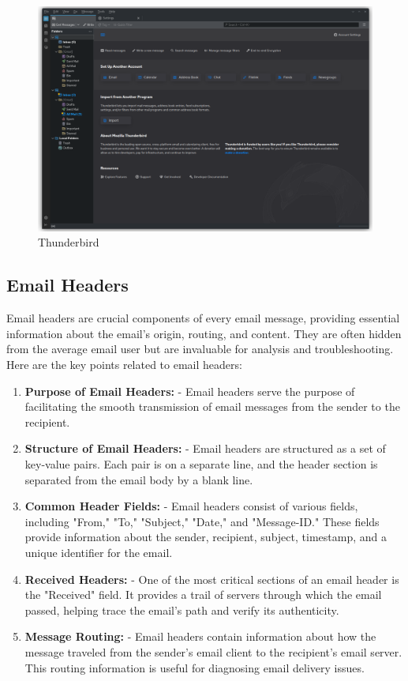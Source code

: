 \documentclass[11pt]{article}
\begin{document}
\begin{figure}[H]
    \centering
    \includegraphics[width=.75\textwidth]{./emailclients/email clients_9.jpg}
    \caption{Thunderbird}
\end{figure}

\subsection{Email Headers}

Email headers are crucial components of every email message, providing essential information about the email's origin, routing, and content. They are often hidden from the average email user but are invaluable for analysis and troubleshooting. Here are the key points related to email headers:

\begin{enumerate}
    \item \textbf{Purpose of Email Headers:}
          - Email headers serve the purpose of facilitating the smooth transmission of email messages from the sender to the recipient.

    \item \textbf{Structure of Email Headers:}
          - Email headers are structured as a set of key-value pairs. Each pair is on a separate line, and the header section is separated from the email body by a blank line.

    \item \textbf{Common Header Fields:}
          - Email headers consist of various fields, including "From," "To," "Subject," "Date," and "Message-ID." These fields provide information about the sender, recipient, subject, timestamp, and a unique identifier for the email.

    \item \textbf{Received Headers:}
          - One of the most critical sections of an email header is the "Received" field. It provides a trail of servers through which the email passed, helping trace the email's path and verify its authenticity.

    \item \textbf{Message Routing:}
          - Email headers contain information about how the message traveled from the sender's email client to the recipient's email server. This routing information is useful for diagnosing email delivery issues.

\end{enumerate}
\end{document}
